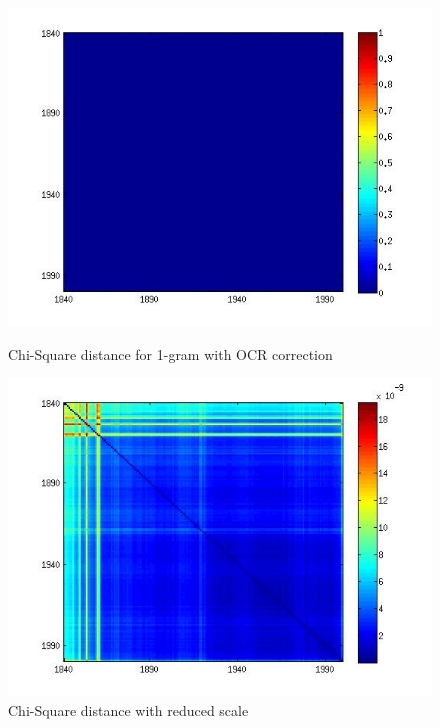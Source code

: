 \begin{figure}[H]
    \begin{minipage}[b]{0.48\linewidth}
        \includegraphics[scale=0.3]{Pictures/chi2/chi2_corrected2.jpg}
        \caption{Chi-Square distance for 1-gram with OCR correction}
        \label{chi2_1}
    \end{minipage}\hfill
    \begin{minipage}[b]{0.5\linewidth}
        \includegraphics[scale=0.3]{Pictures/chi2/chi2_corrected.jpg}
        \caption{Chi-Square distance with reduced scale}
        \label{chi2_2}
    \end{minipage}\hfill
\end{figure}
